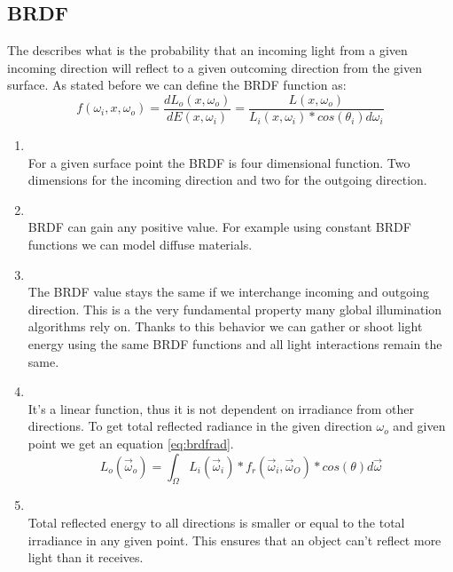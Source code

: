 \subsection{BRDF}
The  describes what is the probability that an incoming light from a given incoming direction will reflect to a given outcoming direction from the given surface. As stated before we can define the BRDF function as:
\begin{equation}
f(\omega_{i},x,\omega_{o})=\frac{dL_{o}(x,\omega_{o})}{dE(x,\omega_{i})}=\frac{L(x,\omega_{o})}{L_{i}(x,\omega_{i})*cos(\theta_{i})d\omega_{i}}
\end{equation}

 \begin{enumerate}
\item {}\\
For a given surface point  the BRDF is four dimensional function. Two dimensions for the incoming direction and two for the outgoing direction.

\item {}\\
BRDF can gain any positive value. For example using constant BRDF functions we can model diffuse materials.

\item {}\\
The BRDF value stays the same if we interchange incoming and outgoing direction. This is a the very fundamental property many global illumination algorithms rely on. Thanks to this behavior we can gather or shoot light energy using the same BRDF functions and all light interactions remain the same. 

\item {}\\
It's a linear function, thus it is not dependent on irradiance from other directions. To get total reflected radiance in the given direction $\omega_{o}$ and given point we get an equation \ref{eq:brdfrad}.
 \begin{equation}
L_{o}(\vec\omega_{o})=\int_{\Omega}L_{i}(\vec\omega_{i})*f_{r}(\vec\omega_{i},\vec\omega_{O})*cos(\theta)d\vec\omega
\label{eq:brdfrad} 
\end{equation}

\item {}\\
Total reflected energy to all directions is smaller or equal to the total irradiance in any given point. This ensures that an object can't reflect more light than it receives. 

\end{enumerate}
\clearpage{}
